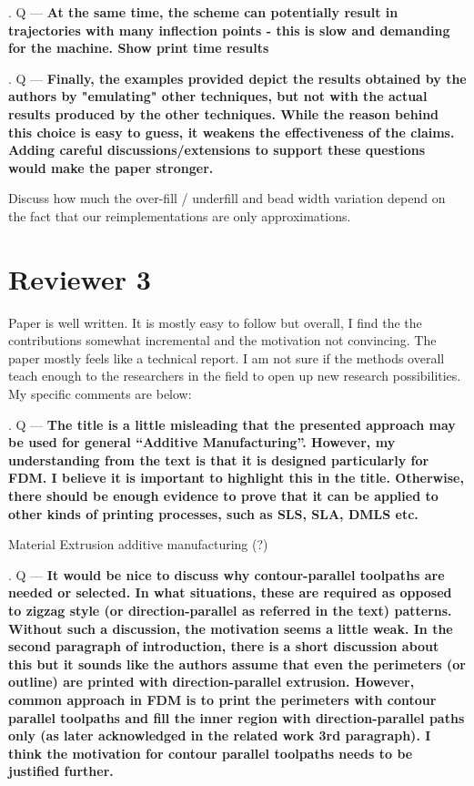\documentclass[5p,twocolumn,10pt,times]{elsarticle}
\theoremstyle{definition}
\newcommand\Que[1]{%
   \leavevmode\par
   \stepcounter{question}
   \noindent
   \thequestion. Q --- {\bf#1}\par}
\newcounter{question}
\numberwithin{question}{section}
\begin{document}
\Que{
At the same time, the scheme can potentially result in trajectories with many inflection points - this is slow and demanding for the machine. 
Show print time results
}

\Que{
Finally, the examples provided depict the results obtained by the authors by "emulating" other techniques, but not with the actual results produced by the other techniques. While the reason behind this choice is easy to guess, it weakens the effectiveness of the claims. Adding careful discussions/extensions to support these questions would make the paper stronger.
}
Discuss how much the over-fill / underfill and bead width variation depend on the fact that our reimplementations are only approximations.






\section{Reviewer 3}
Paper is well written. It is mostly easy to follow but overall, I find the the contributions somewhat incremental and the motivation not convincing. The paper mostly feels like a technical report. I am not sure if the methods overall teach enough to the researchers in the field to open up new research possibilities. My specific comments are below: 

\Que{
The title is a little misleading that the presented approach may be used for general “Additive Manufacturing”. However, my understanding from the text is that it is designed particularly for FDM. I believe it is important to highlight this in the title. Otherwise, there should be enough evidence to prove that it can be applied to other kinds of printing processes, such as SLS, SLA, DMLS etc. 
}
Material Extrusion additive manufacturing (?)

\Que{
It would be nice to discuss why contour-parallel toolpaths are needed or selected. In what situations, these are required as opposed to zigzag style (or direction-parallel as referred in the text) patterns. Without such a discussion, the motivation seems a little weak. In the second paragraph of introduction, there is a short discussion about this but it sounds like the authors assume that even the perimeters (or outline) are printed with direction-parallel extrusion. However, common approach in FDM is to print the perimeters with contour parallel toolpaths and fill the inner region with direction-parallel paths only (as later acknowledged in the related work 3rd paragraph). I think the motivation for contour parallel toolpaths needs to be justified further. 
}
\end{document}
